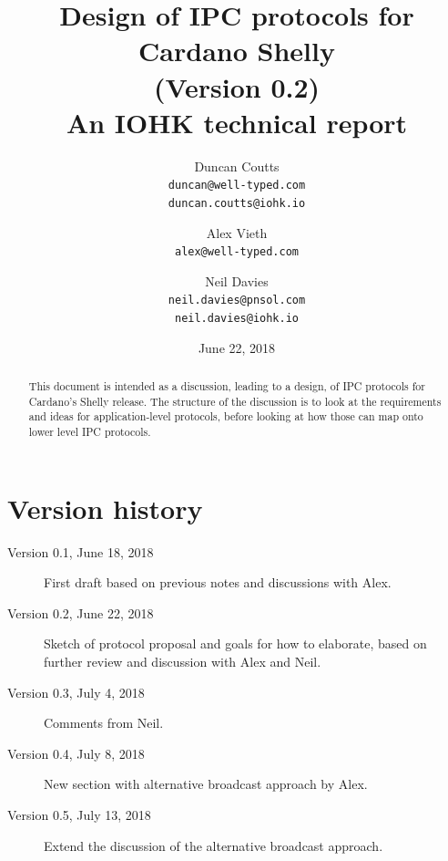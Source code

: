 \documentclass{article}
\theoremstyle{definition}{
  \newtheorem{lemma}{Lemma}[section] %
  \newtheorem{definition}[lemma]{Definition}
}
\theoremstyle{theorem}{
  \newtheorem{invariant}[lemma]{Invariant}
  \newtheorem{proofobligation}[lemma]{Proof Obligation}
}
\numberwithin{equation}{lemma}
\begin{document}
\title{Design of IPC protocols for Cardano Shelly \\
       {\small (Version 0.2)} \\
       {\large \sc An IOHK technical report}}
\author{Duncan Coutts \\ {\small \texttt{duncan@well-typed.com}} \\
                         {\small \texttt{duncan.coutts@iohk.io}}
   \and Alex Vieth \\ {\small \texttt{alex@well-typed.com}}
   \and Neil Davies \\ {\small \texttt{neil.davies@pnsol.com}} \\
                       {\small \texttt{neil.davies@iohk.io}}
   }
\date{June 22, 2018}

\maketitle

\begin{abstract}
This document is intended as a discussion, leading to a design, of IPC
protocols for Cardano's Shelly release. The structure of the discussion is to
look at the requirements and ideas for application-level protocols, before
looking at how those can map onto lower level IPC protocols.
\end{abstract}

\tableofcontents

\section*{Version history}

\begin{description}
\item[Version 0.1, June 18, 2018] First draft based on previous notes and
                                  discussions with Alex.
\item[Version 0.2, June 22, 2018] Sketch of protocol proposal and goals for
                                  how to elaborate, based on further review
                                  and discussion with Alex and Neil.
\item[Version 0.3, July 4, 2018]  Comments from Neil.
\item[Version 0.4, July 8, 2018]  New section with alternative broadcast approach by Alex.
\item[Version 0.5, July 13, 2018] Extend the discussion of the alternative broadcast approach.
\end{description}
\end{document}
